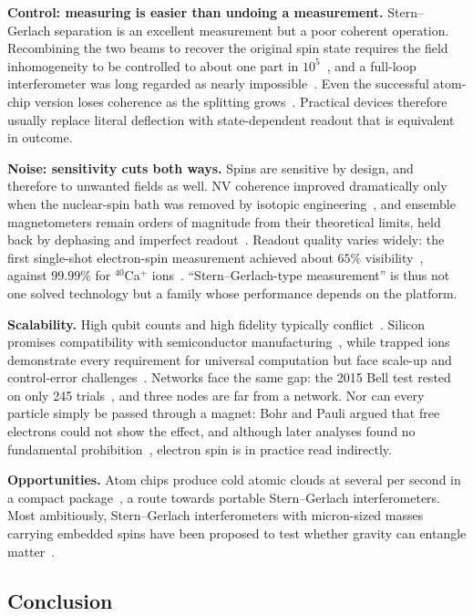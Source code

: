 \documentclass[12pt]{article}
\begin{document}
\textbf{Control: measuring is easier than undoing a measurement.} Stern--Gerlach separation is an excellent measurement but a poor coherent operation. Recombining the two beams to recover the original spin state requires the field inhomogeneity to be controlled to about one part in $10^5$~\cite{englert1988}, and a full-loop interferometer was long regarded as nearly impossible~\cite{margalit2021}. Even the successful atom-chip version loses coherence as the splitting grows~\cite{margalit2021}. Practical devices therefore usually replace literal deflection with state-dependent readout that is equivalent in outcome.

\textbf{Noise: sensitivity cuts both ways.} Spins are sensitive by design, and therefore to unwanted fields as well. NV coherence improved dramatically only when the nuclear-spin bath was removed by isotopic engineering~\cite{balasubramanian2009}, and ensemble magnetometers remain orders of magnitude from their theoretical limits, held back by dephasing and imperfect readout~\cite{barry2020}. Readout quality varies widely: the first single-shot electron-spin measurement achieved about $65\%$ visibility~\cite{elzerman2004}, against $99.99\%$ for $^{40}$Ca$^+$ ions~\cite{myerson2008}. ``Stern--Gerlach-type measurement'' is thus not one solved technology but a family whose performance depends on the platform.

\textbf{Scalability.} High qubit counts and high fidelity typically conflict~\cite{philips2022}. Silicon promises compatibility with semiconductor manufacturing~\cite{burkard2023,xue2022}, while trapped ions demonstrate every requirement for universal computation but face scale-up and control-error challenges~\cite{bruzewicz2019}. Networks face the same gap: the 2015 Bell test rested on only 245 trials~\cite{hensen2015}, and three nodes are far from a network. Nor can every particle simply be passed through a magnet: Bohr and Pauli argued that free electrons could not show the effect, and although later analyses found no fundamental prohibition~\cite{garraway2002,batelaan1997}, electron spin is in practice read indirectly.

\textbf{Opportunities.} Atom chips produce cold atomic clouds at several per second in a compact package~\cite{keil2016}, a route towards portable Stern--Gerlach interferometers. Most ambitiously, Stern--Gerlach interferometers with micron-sized masses carrying embedded spins have been proposed to test whether gravity can entangle matter~\cite{bose2017}.

\subsection{Conclusion}
\end{document}
